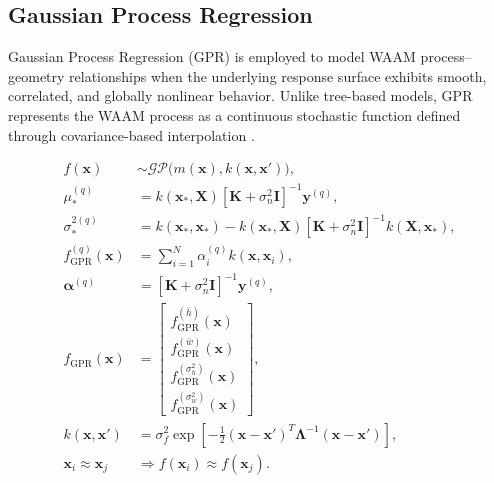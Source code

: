 \documentclass[11pt]{article}
\begin{document}
\subsection*{Gaussian Process Regression}

Gaussian Process Regression (GPR) is employed to model WAAM process--geometry relationships when the underlying response surface exhibits smooth, correlated, and globally nonlinear behavior. Unlike tree-based models, GPR represents the WAAM process as a continuous stochastic function defined through covariance-based interpolation \cite{Rasmussen2006}.

\begin{tcolorbox}[colback=white,colframe=black,boxrule=0.5pt,arc=2pt]
\begin{equation}
\begin{aligned}
f(\mathbf{x}) &\sim \mathcal{GP}\big(m(\mathbf{x}), k(\mathbf{x},\mathbf{x}')\big), \\
\mu_{*}^{(q)} &= k(\mathbf{x}_{*},\mathbf{X})\left[\mathbf{K} + \sigma_n^2\mathbf{I}\right]^{-1}\mathbf{y}^{(q)}, \\
\sigma_{*}^{2(q)} &= k(\mathbf{x}_{*},\mathbf{x}_{*}) - k(\mathbf{x}_{*},\mathbf{X})\left[\mathbf{K} + \sigma_n^2\mathbf{I}\right]^{-1}k(\mathbf{X},\mathbf{x}_{*}), \\
f_{\mathrm{GPR}}^{(q)}(\mathbf{x}) &= \sum_{i=1}^{N} \alpha_i^{(q)} k(\mathbf{x},\mathbf{x}_i), \\
\boldsymbol{\alpha}^{(q)} &= \left[\mathbf{K} + \sigma_n^2\mathbf{I}\right]^{-1}\mathbf{y}^{(q)}, \\
f_{\mathrm{GPR}}(\mathbf{x}) &=
\begin{bmatrix}
f_{\mathrm{GPR}}^{(\bar{h})}(\mathbf{x}) \\
f_{\mathrm{GPR}}^{(\bar{w})}(\mathbf{x}) \\
f_{\mathrm{GPR}}^{(\sigma_h^2)}(\mathbf{x}) \\
f_{\mathrm{GPR}}^{(\sigma_w^2)}(\mathbf{x})
\end{bmatrix}, \\
k(\mathbf{x},\mathbf{x}') &= \sigma_f^2 \exp\left[-\frac{1}{2}(\mathbf{x}-\mathbf{x}')^{T}\mathbf{\Lambda}^{-1}(\mathbf{x}-\mathbf{x}')\right], \\
\mathbf{x}_i \approx \mathbf{x}_j &\Rightarrow f(\mathbf{x}_i) \approx f(\mathbf{x}_j).
\end{aligned}
\end{equation}
\end{tcolorbox}
\end{document}
